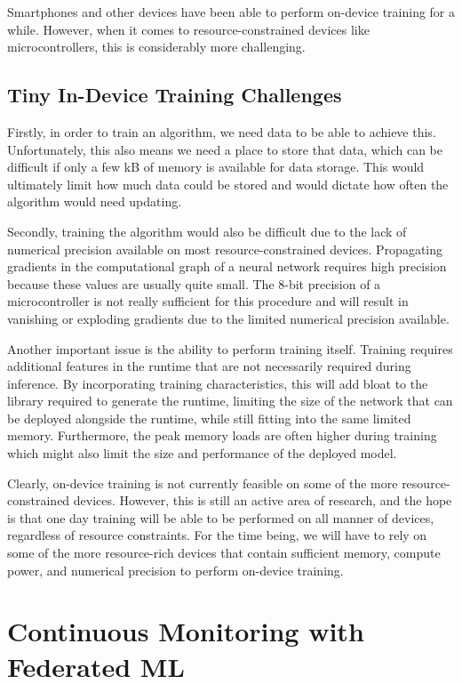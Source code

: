 {{{{{{{{{    Smartphones and other devices have been able to perform on-device training for a while. However, when it comes to resource-constrained devices like microcontrollers, this is considerably more challenging.
    
    \subsection{Tiny In-Device Training Challenges}
    
    Firstly, in order to train an algorithm, we need data to be able to achieve this. Unfortunately, this also means we need a place to store that data, which can be difficult if only a few kB of memory is available for data storage. This would ultimately limit how much data could be stored and would dictate how often the algorithm would need updating.
    
    Secondly, training the algorithm would also be difficult due to the lack of numerical precision available on most resource-constrained devices. Propagating gradients in the computational graph of a neural network requires high precision because these values are usually quite small. The 8-bit precision of a microcontroller is not really sufficient for this procedure and will result in vanishing or exploding gradients due to the limited numerical precision available.
    
    Another important issue is the ability to perform training itself. Training requires additional features in the runtime that are not necessarily required during inference. By incorporating training characteristics, this will add bloat to the library required to generate the runtime, limiting the size of the network that can be deployed alongside the runtime, while still fitting into the same limited memory. Furthermore, the peak memory loads are often higher during training which might also limit the size and performance of the deployed model.
    
    Clearly, on-device training is not currently feasible on some of the more resource-constrained devices. However, this is still an active area of research, and the hope is that one day training will be able to be performed on all manner of devices, regardless of resource constraints. For the time being, we will have to rely on some of the more resource-rich devices that contain sufficient memory, compute power, and numerical precision to perform on-device training.        
        
\section{Continuous Monitoring with Federated ML}

}}}}}}}}}
